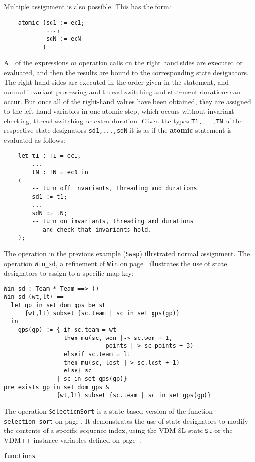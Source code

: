 \documentclass{overturerepchap}
\newcommand{\keyw}[1]{{\bf\ttfamily #1}}
\begin{document}
{\begin{description}
  Multiple assignment is also possible. This has the form:
  \begin{lstlisting}
    atomic (sd1 := ec1;
            ...;
            sdN := ecN
           )
  \end{lstlisting}
  All of the expressions or operation calls on the right hand sides
  are executed or evaluated, and then the results are bound to the
  corresponding state designators. The right-hand sides are executed
  in the order given in the statement, and normal invariant processing
  and thread switching and statement durations can occur. But once all
  of the right-hand values have been obtained, they are assigned to the
  left-hand variables in one atomic step, which occurs without invariant
  checking, thread switching or extra duration. Given the types \texttt{T1,...,TN} of the respective state designators \texttt{sd1,...,sdN} it is as if the
  \keyw{atomic} statement is evaluated as follows:
  \begin{lstlisting}
    let t1 : T1 = ec1,
        ...
        tN : TN = ecN in
    (
        -- turn off invariants, threading and durations
        sd1 := t1;
        ...
        sdN := tN;
        -- turn on invariants, threading and durations
        -- and check that invariants hold.
    );
  \end{lstlisting}


\item[Examples:] The operation in the previous example (\texttt{Swap})
  illustrated normal assignment. The operation \texttt{Win\_sd}, a
  refinement of \texttt{Win} on page~\pageref{winDef} illustrates the use of
  state designators to assign to a specific map key:
  \begin{lstlisting}
Win_sd : Team * Team ==> ()
Win_sd (wt,lt) ==
  let gp in set dom gps be st
      {wt,lt} subset {sc.team | sc in set gps(gp)}
  in
    gps(gp) := { if sc.team = wt
                 then mu(sc, won |-> sc.won + 1,
                             points |-> sc.points + 3)
                 elseif sc.team = lt
                 then mu(sc, lost |-> sc.lost + 1)
                 else} sc
               | sc in set gps(gp)}
pre exists gp in set dom gps &
               {wt,lt} subset {sc.team | sc in set gps(gp)}
  \end{lstlisting}
  The operation \texttt{SelectionSort} is a state based version of the
  function \texttt{selection\_sort} on page \pageref{selectionSortdef}. It 
  demonstrates the use of state designators to modify the contents of a
  specific sequence index, using the VDM-SL
state \texttt{St} or the VDM++
instance variables
 defined on page~\pageref{stdef}.
  \begin{lstlisting}
functions


\end{lstlisting}
\end{description}}
\end{document}
